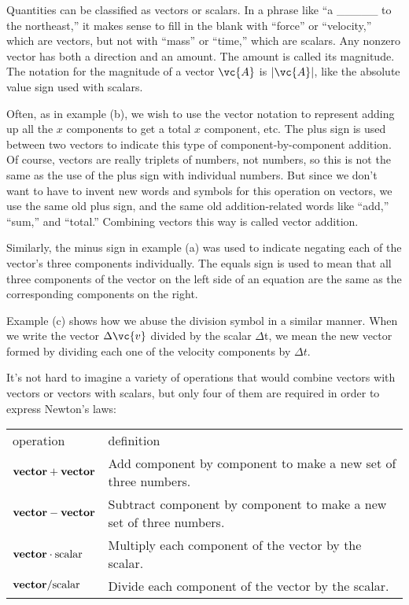 Quantities can be classified as vectors or scalars. In a phrase like
``a \_\_\_\_\_ to the northeast,'' it makes sense to fill in the blank
with ``force'' or ``velocity,'' which are vectors, but not with ``mass''
or ``time,'' which are scalars.
Any nonzero vector has both a direction and an amount.
The amount is called its 
magnitude. The notation for the magnitude of a vector $\vc{A}$
is $|\vc{A}|$, like the absolute value sign used with scalars.

Often, as in example (b), we wish to use the vector notation
to represent adding up all the $x$ components to get a total
$x$ component, etc. The plus sign is used between two
vectors to indicate this type of component-by-component
addition. Of course, vectors are really triplets of numbers,
not numbers, so this is not the same as the use of the plus
sign with individual numbers. But since we don't want to
have to invent new words and symbols for this operation on
vectors, we use the same old plus sign, and the same old
addition-related words like ``add,'' ``sum,'' and ``total.''
Combining vectors this way is called vector addition.

Similarly, the minus sign in example (a) was used to
indicate negating each of the vector's three components
individually. The equals sign is used to mean that all three
components of the vector on the left side of an equation are
the same as the corresponding components on the right.

Example (c) shows how we abuse the division symbol in a
similar manner. When we write the vector $\Delta \vc{v}$ divided
by the scalar $\Delta $t, we mean the new vector formed by
dividing each one of the velocity components by $\Delta t$.

It's not hard to imagine a variety of operations that would
combine vectors with vectors or vectors with scalars, but
only four of them are required in order to express Newton's laws:

\pagebreak

\begin{tabular}{lp{60mm}}
operation & definition \\
$\text{\textbf{vector}}+\text{\textbf{vector}}$ & Add component by component to make a new set of three numbers.\\
$\text{\textbf{vector}}-\text{\textbf{vector}}$ & Subtract component by component to make a new set of three numbers.\\
$\text{\textbf{vector}}\cdot\text{scalar}$ & Multiply each component of the vector by the scalar.\\
$\text{\textbf{vector}}/\text{scalar}$ & Divide each component of the vector by the scalar.
\end{tabular}

